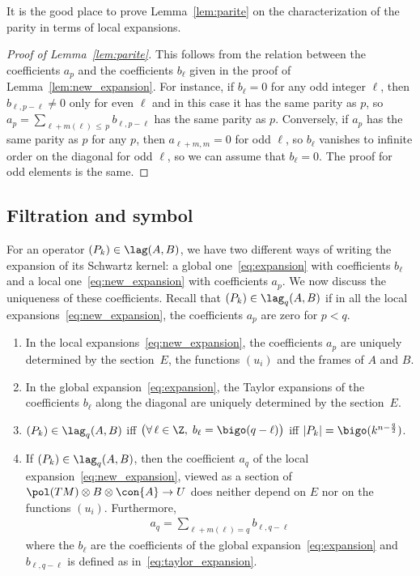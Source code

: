 It is the good place to prove Lemma~\ref{lem:parite} on the characterization of the parity in terms of local expansions.
\begin{proof}[Proof of Lemma~\ref{lem:parite}]
This follows from the relation between the coefficients $a_{p}$ and the coefficients $b_{\ell}$ given in the proof of Lemma~\ref{lem:new_expansion}. For instance, if $b_{\ell} =0$ for any odd integer $\ell$, then $b_{\ell, p-\ell} \neq 0$ only for even $\ell$ and in this case it has the same parity as $p$, so $ a_p = \sum _{\ell + m (\ell)
\,\leqslant\,p } b_{\ell, p - \ell} $ has the same parity as $p$. Conversely, if $a_{p}$ has the same parity as $p$ for any $p$, then $a_{ \ell+m, m } =0$ for odd $\ell$, so $b_{\ell} $ vanishes to infinite order on the diagonal for odd $\ell$, so we can assume that $b_{\ell} =0$. The proof for odd elements is the same.
\end{proof}



\subsection{Filtration and symbol}
For an operator $(P_k) \in \lag (A,B)$, we have two different ways of writing the expansion of its Schwartz kernel: a global one~\eqref{eq:expansion} with coefficients $b_\ell$ and a local one~\eqref{eq:new_expansion} with coefficients $a_p$. We now discuss the uniqueness of these coefficients. Recall that $(P_k) \in \lag_q (A,B)$ if in all the local expansions~\eqref{eq:new_expansion}, the coefficients $a_{p} $ are zero for $p < q$.

\begin{prop}\label{prop:filtration-symbol}\leavevmode
\begin{enumerate}
\item\label{prop5.5.1} In the local expansions~\eqref{eq:new_expansion}, the coefficients $a_{p}$ are uniquely determined by the section~$E$, the functions $(u_i)$ and the frames of $A$ and $B$.
\item\label{prop5.5.2} In the global expansion~\eqref{eq:expansion}, the Taylor expansions of the coefficients $b_{\ell}$ along the diagonal are uniquely determined by the section~$E$.
\item\label{prop5.5.3} $ (P_k) \in \lag_q (A,B)$ iff $\bigl(\forall \, \ell \in\Z, \; b_{\ell} = \bigo (q - \ell) \bigr)$ iff $| P_k | = \bigo (k^{n-\frac{q}{2}}) $.
\item\label{prop5.5.4} If $(P_k) \in \lag_q (A,B)$, then the coefficient $a_q$ of the local expansion~\eqref{eq:new_expansion}, viewed as a section of $ \pol (TM) \otimes B \otimes \con{A} \rightarrow U$ does neither depend on $E$ nor on the functions $(u_i)$. Furthermore,
\begin{gather}\label{eq:a_n_fonction_b_ell}
a_q = \sum_{\ell + m (\ell) = q} b_{\ell, q - \ell}
\end{gather}
where the $b_{\ell}$ are the coefficients of the global expansion~\eqref{eq:expansion} and $b_{\ell, q-\ell}$ is defined as in~\eqref{eq:taylor_expansion}.
\end{enumerate}
\end{prop}

